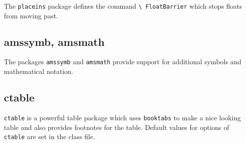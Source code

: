 \documentclass{adharticle}  %
\begin{document}
The \texttt{placeins} package defines the command \texttt{\textbackslash
  FloatBarrier} which stops floats from moving past.

\subsection{amssymb, amsmath}

The packages \texttt{amssymb} and \texttt{amsmath} provide support for additional
symbols and mathematical notation.


\subsection{ctable}

\texttt{ctable} is a powerful table package which uses \texttt{booktabs} to make
a nice looking table and also provides footnotes for the table. Default values
for options of \texttt{ctable} are set in the class file.
\end{document}
